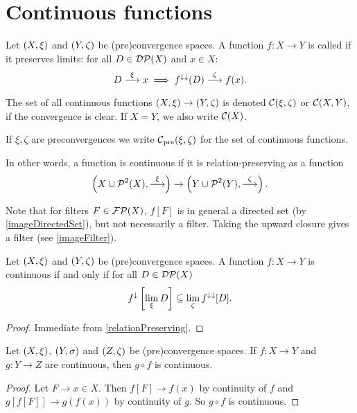 \section{Continuous functions}
\begin{definition}
Let $\left( X,\xi \right)$ and $\left( Y,\zeta \right)$ be (pre)convergence spaces. A function $f: X\to Y$ is called  if it preserves limits: for all $D \in \operatorname{\mathcal{DP}}(X)$ and $x\in X$:
\[ D \overset{\xi}{\longrightarrow} x \implies f^{\downarrow\downarrow}(D) \overset{\zeta}{\longrightarrow} f(x). \]

The set of all continuous functions $\left( X,\xi \right) \to \left( Y,\zeta \right)$ is denoted $\operatorname{\mathcal{C}}(\xi, \zeta)$ or $\operatorname{\mathcal{C}}(X,Y)$, if the convergence is clear. If $X=Y$, we also write $\operatorname{\mathcal{C}}(X)$.

If $\xi,\zeta$ are preconvergences we write $\operatorname{\mathcal{C}}_\text{pre}(\xi, \zeta)$ for the set of continuous functions.
\end{definition}
In other words, a function is continuous if it is relation-preserving as a function
\[ \left( X \cup \operatorname{\mathcal{P}}^2(X), \overset{\xi}{\longrightarrow} \right) \to \left( Y \cup \operatorname{\mathcal{P}}^2(Y), \overset{\zeta}{\longrightarrow} \right). \]

Note that for filters $F\in\operatorname{\mathcal{FP}}(X)$, $f[F]$ is in general a directed set (by \ref{imageDirectedSet}), but not necessarily a filter. Taking the upward closure gives a filter (see \ref{imageFilter}).

\begin{lemma}
Let $\left( X,\xi \right)$ and $\left( Y,\zeta \right)$ be (pre)convergence spaces. A function $f: X\to Y$ is continuous \textup{if and only if} for all $D \in \operatorname{\mathcal{DP}}(X)$
\[ f^{\downarrow}\left[\lim_\xi D \right] \subseteq \lim_\zeta f^{\downarrow\downarrow}[D]. \]
\end{lemma}
\begin{proof}
Immediate from \ref{relationPreserving}.
\end{proof}

\begin{lemma} \label{continuityComposition}
Let $\left( X,\xi \right)$, $\left( Y,\sigma \right)$ and $\left( Z,\zeta \right)$ be (pre)convergence spaces. If $f: X\to Y$ and $g: Y\to Z$ are continuous, then $g\circ f$ is continuous.
\end{lemma}
\begin{proof}
Let $F\to x\in X$. Then $f[F] \to f(x)$ by continuity of $f$ and $g[f[F]] \to g(f(x))$ by continuity of $g$. So $g\circ f$ is continuous.
\end{proof}

